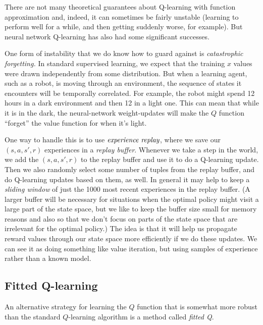 There are not many theoretical guarantees about Q-learning with
function approximation and, indeed, it can sometimes be fairly
unstable (learning to perform well for a while, and then getting
suddenly worse, for example).  But neural network Q-learning has also
had some significant successes.

One form of instability that we do know how to guard against is {\em
    catastrophic forgetting.}  In standard supervised learning, we
expect that the training $x$ values were drawn independently from some
distribution.   But when a learning agent, such as a robot,
is moving through an environment, the sequence of states it encounters
will be temporally correlated. For example, the robot might spend 12
hours in a dark environment and then 12 in a light one.  This can mean
that while it is in the dark, the neural-network weight-updates will
make the $Q$ function ``forget'' the value function for when it's
light.

One way to handle this is to use $\emph{experience
    replay}$, where we save our $(s,a,s',r)$
experiences in a {\it replay buffer}.  Whenever we take a step in the
world, we add the $(s,a,s',r)$ to the replay buffer and use it to do a
Q-learning update.  Then we also randomly select some number of tuples
from the replay buffer, and do Q-learning updates based on them, as
well.  In general it may help to keep a {\em sliding
    window} of just the 1000 most recent
experiences in the replay buffer.  (A larger buffer will be necessary
for situations when the optimal policy might visit a large part of the
state space, but we like to keep the buffer size small for memory
reasons and also so that we don't focus on parts of the state space
that are irrelevant for the optimal policy.)  The idea is that it will
help us propagate reward values through our state space more
efficiently if we do these updates. We can see it as doing something
like value iteration, but using samples of experience rather than a
known model.

\subsection{Fitted Q-learning}
An alternative strategy for learning the $Q$ function that is somewhat
more robust than the standard $Q$-learning algorithm is a method
called {\em fitted Q}.

